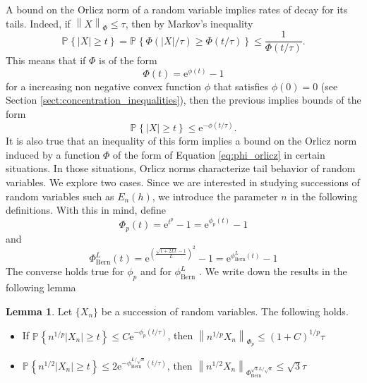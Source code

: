 \documentclass{uvamath}
\newcommand*{\prob}[2][]{\mathbb{P}_{#1}\left\{#2\right\}}
\newcommand*{\paren}[1]{\left(#1\right)}
\newcommand*{\norm}[1]{\left\lVert#1\right\rVert}
\newcommand*{\rme}{\mathrm{e}}
\theoremstyle{remark}
\theoremstyle{definition}
\theoremstyle{definition}
\theoremstyle{definition}
\theoremstyle{definition}
\newtheorem{lemma}[theorem]{Lemma}
\theoremstyle{definition}
\begin{document}
\begin{appendices}
A bound on the Orlicz norm of a random variable implies rates of decay
for its tails. Indeed, if $\norm{X}_{\Phi}\leq \tau$, then by Markov's
inequality
\begin{equation*}
  \prob{|X|\geq t} = \prob{\Phi(|X| / \tau )\geq \Phi(t/\tau)} \leq \frac{1}{\Phi(t/\tau)}.
\end{equation*}
This means that if $\Phi$ is of the form
\begin{equation}\label{eq:phi_orlicz}
  \Phi(t) = \rme^{\phi(t)} - 1
\end{equation}
for a increasing non negative convex function $\phi$ that satisfies
$\phi(0)=0$ (see Section \ref{sect:concentration_inequalities}), then
the previous implies bounds of the form
\begin{equation*}
  \prob{|X|\geq t}\leq \rme^{-\phi(t/\tau)}.
\end{equation*}
It is also true that an inequality of this form implies a bound on the
Orlicz norm induced by a function $\Phi$ of the form of Equation
\eqref{eq:phi_orlicz} in certain situations. In those situations, Orlicz
norms characterize tail behavior of random variables. We explore two
cases. Since we are interested in studying successions of random
variables such as $E_n(h)$, we introduce the parameter $n$ in the
following definitions. With this in mind, define
\begin{equation*}%
  \Phi_{p}(t) = \rme^{t^p}-1 = \rme^{\phi_p(t)}-1
\end{equation*}
and
\begin{equation*}%
  \Phi_{\text{Bern}}^L(t) = \rme^{\paren{\frac{\sqrt{1 + 2Lt} - 1}{L}}^2}-1 = \rme^{\phi_{\text{Bern}}^L(t)}-1
\end{equation*}
The converse holds true for $\phi_p$ \citep[Lemma
2.2.1]{van_der_vaart_weak_1996} and for $\phi_{\text{Bern}}^L$
\citep[Lemma 2]{van_de_geer_bernsteinorlicz_2013}. We write down the
results in the following lemma
\begin{lemma}\label{lem:tail_and_orlicz}
  Let $\{X_n\}$ be a succession of random variables. The following
  holds.
  \begin{itemize}
  \item If $\prob{n^{1/p}|X_n|\geq t}\leq C\rme^{-\phi_p(t/\tau)}$, then
    $\norm{n^{1/p}X_n}_{\Phi_p}\leq (1+C)^{1/p}\tau$
  \item
    $\prob{n^{1/2}|X_n|\geq t}\leq 2\rme^{-\phi_{\text{Bern}}^{L/\sqrt{n}}(t/\tau)}$,
    then $\norm{n^{1/2}X_n}_{\Phi_{\text{Bern}}^{\sqrt{3}L/\sqrt{n}}}\leq \sqrt{3}\tau$
  \end{itemize}
\end{lemma}


\end{appendices}
\end{document}
